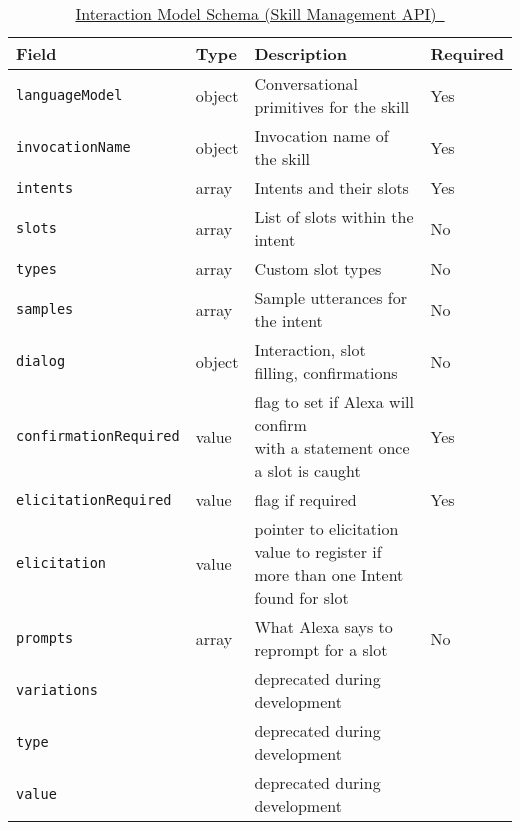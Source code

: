 %


\begin{table}[h!]
	\caption[Interaction Model Schema]{\href{https://developer.amazon.com/docs/smapi/interaction-model-schema.html}{Interaction Model Schema (Skill Management API)~\cite{alexaDesignGuide} }}\label{interactionModel}
	
	\begin{tabularx}{\textwidth}{l | l l l  }
		Field	&	Type	&	Description		&	Required \\ \hline \hline
		\lstinline|languageModel| &	object	& Conversational primitives for the skill	& Yes\\
		\quad\lstinline|invocationName| &	object	& Invocation name of the skill	& Yes\\
		\quad\lstinline|intents| &	array	& Intents and their slots	& Yes\\
		\quad\quad\lstinline|slots|  & array & List of slots within the intent	& No\\
		\quad\lstinline|types| &	array	& Custom slot types		& No\\
		\quad\quad\lstinline|samples|	& array	 & Sample utterances for the intent	& No\\
		
		\lstinline|dialog| & object & Interaction, slot filling, confirmations & No\\
		\quad \lstinline|confirmationRequired| & value & \shortstack[l]{flag to set if Alexa will confirm\\ with a statement once a slot is caught}& Yes \\
		\lstinline|elicitationRequired| & value & flag if required & Yes\\
		\lstinline|elicitation| & value & \shortstack[l]{pointer to elicitation value to register if  \\  more than one Intent found for slot}  & \\
		\lstinline|prompts| & array & What Alexa says to reprompt for a slot & No \\
		\quad \quad \lstinline|variations|  & & deprecated during development& \\
		\quad \quad \quad \lstinline|type|  & & deprecated during development & \\
		\quad \quad \quad \lstinline|value|  & & deprecated during development & \\ \hline
		
	\end{tabularx}			
\end{table}

